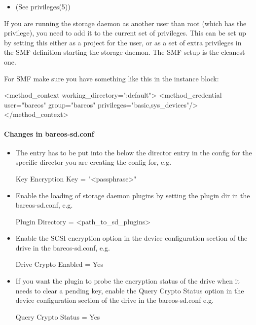 \begin{itemize}
 \item {} (See privileges(5))
\end{itemize}

If you are running the storage daemon as another user than root (which has the  privilege), you need to add it to the current set of privileges.
This can be set up by setting this either as a project for the user, or as a set of extra privileges in the SMF definition starting the storage daemon. The SMF setup is the cleanest one.

For SMF make sure you have something like this in the instance block:

\begin{bconfig}{}
<method_context working_directory=":default"> <method_credential user="bareos" group="bareos" privileges="basic,sys_devices"/> </method_context>
\end{bconfig}

\paragraph{Changes in bareos-sd.conf}

\begin{itemize}
 \item The entry  has to be put into the  below the director entry in the config for the specific director you are creating the config for, e.g.
 \begin{bconfig}{}
  Key Encryption Key = "<passphrase>"
 \end{bconfig}
 \item Enable the loading of storage daemon plugins by setting the plugin dir in the bareos-sd.conf, e.g.
 \begin{bconfig}{}
  Plugin Directory = <path_to_sd_plugins>
 \end{bconfig}
 \item Enable the SCSI encryption option in the device configuration section of the drive in the bareos-sd.conf, e.g.
 \begin{bconfig}{}
  Drive Crypto Enabled = Yes
 \end{bconfig}
 \item If you want the plugin to probe the encryption status of the drive when it needs to clear a pending key, enable the Query Crypto Status option in the device configuration section of the drive in the bareos-sd.conf e.g.
 \begin{bconfig}{}
  Query Crypto Status = Yes
 \end{bconfig}
\end{itemize}

